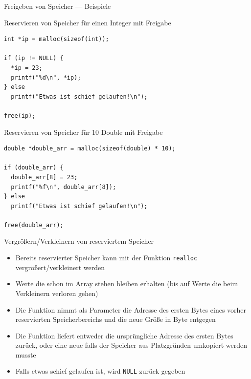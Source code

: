 \documentclass[presentation]{beamer}
\begin{document}
\begin{frame}[label={sec:orgb2b2004},fragile]{Freigeben von Speicher --- Beispiele}
 \begin{block}{Reservieren von Speicher für einen Integer mit Freigabe}
\begin{verbatim}
int *ip = malloc(sizeof(int));

if (ip != NULL) {
  *ip = 23;
  printf("%d\n", *ip);
} else
  printf("Etwas ist schief gelaufen!\n");

free(ip);
\end{verbatim}
\end{block}
\begin{block}{Reservieren von Speicher für 10 Double mit Freigabe}
\begin{verbatim}
double *double_arr = malloc(sizeof(double) * 10);

if (double_arr) {
  double_arr[8] = 23;
  printf("%f\n", double_arr[8]);
} else
  printf("Etwas ist schief gelaufen!\n");

free(double_arr);
\end{verbatim}
\end{block}
\end{frame}
\begin{frame}[label={sec:org126e245},fragile]{Vergrößern/Verkleinern von reserviertem Speicher}
 \begin{itemize}
\item Bereits reservierter Speicher kann mit der Funktion {\color{solarizedYellow}\texttt{realloc}}
vergrößert/verkleinert werden
\item Werte die schon im Array stehen bleiben erhalten (bis auf Werte die
beim Verkleinern verloren gehen)
\item Die Funktion nimmt als Parameter die Adresse des ersten Bytes eines
vorher reservierten Speicherbereichs und die neue Größe in Byte
entgegen
\item Die Funktion liefert entweder die ursprüngliche Adresse des ersten
Bytes zurück, oder eine neue falls der Speicher aus Platzgründen
umkopiert werden musste
\item Falls etwas schief gelaufen ist, wird {\color{solarizedYellow}\texttt{NULL} }zurück gegeben
\end{itemize}
\end{frame}
\end{document}
